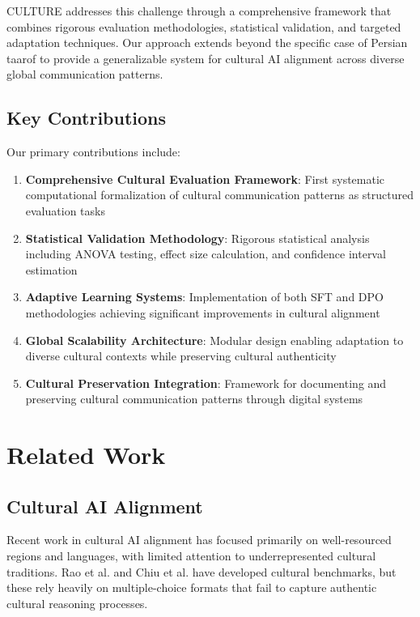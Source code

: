 \documentclass[11pt,twocolumn]{article}
\begin{document}
CULTURE addresses this challenge through a comprehensive framework that combines rigorous evaluation methodologies, statistical validation, and targeted adaptation techniques. Our approach extends beyond the specific case of Persian taarof to provide a generalizable system for cultural AI alignment across diverse global communication patterns.

\subsection{Key Contributions}

Our primary contributions include:

\begin{enumerate}
    \item \textbf{Comprehensive Cultural Evaluation Framework}: First systematic computational formalization of cultural communication patterns as structured evaluation tasks
    \item \textbf{Statistical Validation Methodology}: Rigorous statistical analysis including ANOVA testing, effect size calculation, and confidence interval estimation
    \item \textbf{Adaptive Learning Systems}: Implementation of both SFT and DPO methodologies achieving significant improvements in cultural alignment
    \item \textbf{Global Scalability Architecture}: Modular design enabling adaptation to diverse cultural contexts while preserving cultural authenticity
    \item \textbf{Cultural Preservation Integration}: Framework for documenting and preserving cultural communication patterns through digital systems
\end{enumerate}

\section{Related Work}

\subsection{Cultural AI Alignment}

Recent work in cultural AI alignment has focused primarily on well-resourced regions and languages, with limited attention to underrepresented cultural traditions. Rao et al. \cite{rao2025} and Chiu et al. \cite{chiu2024} have developed cultural benchmarks, but these rely heavily on multiple-choice formats that fail to capture authentic cultural reasoning processes.
\end{document}
